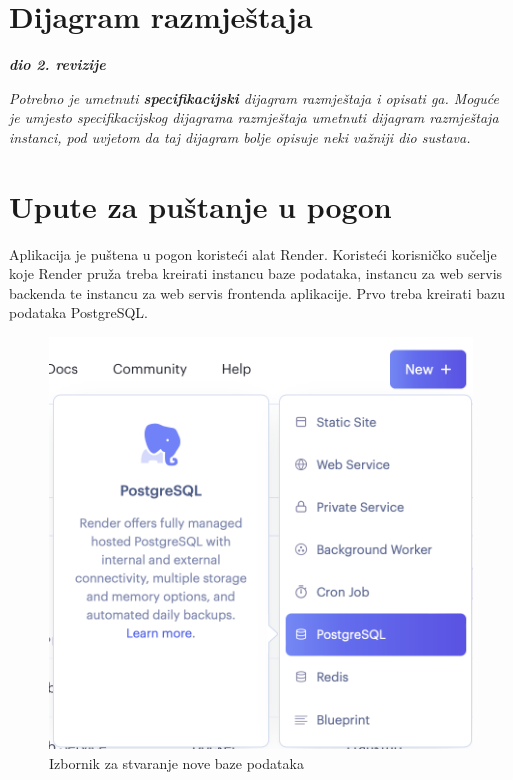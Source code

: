 			\eject 
		
		
		\section{Dijagram razmještaja}
			
			\textbf{\textit{dio 2. revizije}}
			
			 \textit{Potrebno je umetnuti \textbf{specifikacijski} dijagram razmještaja i opisati ga. Moguće je umjesto specifikacijskog dijagrama razmještaja umetnuti dijagram razmještaja instanci, pod uvjetom da taj dijagram bolje opisuje neki važniji dio sustava.}
			
			\eject 
		
		\section{Upute za puštanje u pogon}
		
		Aplikacija je puštena u pogon koristeći alat Render. Koristeći korisničko sučelje koje Render pruža treba kreirati instancu baze podataka, instancu za web servis backenda te instancu za web servis frontenda aplikacije. Prvo treba kreirati bazu podataka PostgreSQL.
			
			\begin{figure}[H]
				\includegraphics[scale=0.3]{slike/deploy/database1.png} %
				\centering
				\caption{Izbornik za stvaranje nove baze podataka}
				\label{fig:promjene}
			\end{figure}
			
